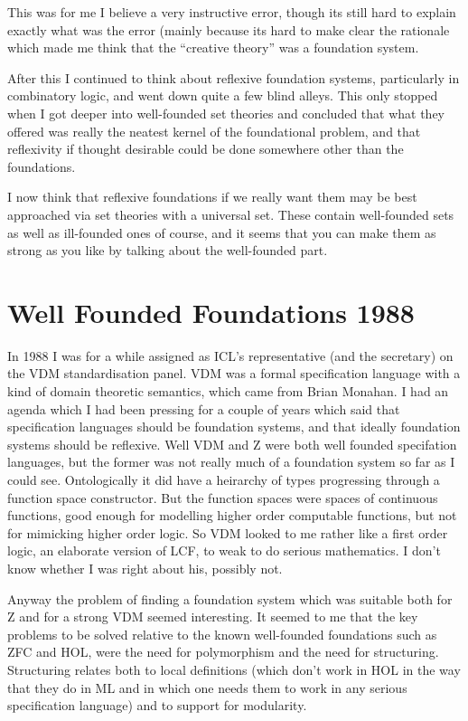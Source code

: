 \documentclass[10pt,titlepage]{book}
\begin{document}
This was for me I believe a very instructive error, though its still hard to explain exactly what was the error (mainly because its hard to make clear the rationale which made me think that the ``creative theory'' was a foundation system.

After this I continued to think about reflexive foundation systems, particularly in combinatory logic, and went down quite a few blind alleys.
This only stopped when I got deeper into well-founded set theories and concluded that what they offered was really the neatest kernel of the foundational problem, and that reflexivity if thought desirable could be done somewhere other than the foundations.

I now think that reflexive foundations if we really want them may be best approached via set theories with a universal set.
These contain well-founded sets as well as ill-founded ones of course, and it seems that you can make them as strong as you like by talking about the well-founded part.

\section{Well Founded Foundations 1988}

In 1988 I was for a while assigned as ICL's representative (and the secretary) on the VDM standardisation panel.
VDM was a formal specification language with a kind of domain theoretic semantics, which came from Brian Monahan.
I had an agenda which I had been pressing for a couple of years which said that specification languages should be foundation systems, and that ideally foundation systems should be reflexive.
Well VDM and Z were both well founded specifation languages, but the former was not really much of a foundation system so far as I could see.
Ontologically it did have a heirarchy of types progressing through a function space constructor.
But the function spaces were spaces of continuous functions, good enough for modelling higher order computable functions, but not for mimicking higher order logic.
So VDM looked to me rather like a first order logic, an elaborate version of LCF, to weak to do serious mathematics.
I don't know whether I was right about his, possibly not.

Anyway the problem of finding a foundation system which was suitable both for Z and for a strong VDM seemed interesting.
It seemed to me that the key problems to be solved relative to the known well-founded foundations such as ZFC and HOL, were the need for polymorphism and the need for structuring.
Structuring relates both to local definitions (which don't work in HOL in the way that they do in ML and in which one needs them to work in any serious specification language) and to support for modularity.
\end{document}

